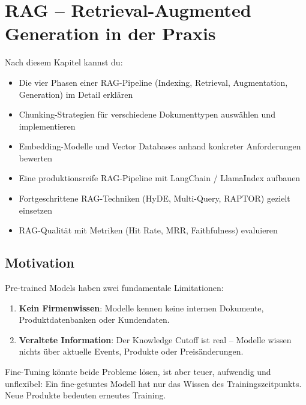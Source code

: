 \chapter{RAG -- Retrieval-Augmented Generation in der Praxis}
\label{chap:rag_vector_dbs}

\begin{lernziele}
Nach diesem Kapitel kannst du:
\begin{itemize}
    \item Die vier Phasen einer RAG-Pipeline (Indexing, Retrieval, Augmentation, Generation) im Detail erklären
    \item Chunking-Strategien für verschiedene Dokumenttypen auswählen und implementieren
    \item Embedding-Modelle und Vector Databases anhand konkreter Anforderungen bewerten
    \item Eine produktionsreife RAG-Pipeline mit LangChain / LlamaIndex aufbauen
    \item Fortgeschrittene RAG-Techniken (HyDE, Multi-Query, RAPTOR) gezielt einsetzen
    \item RAG-Qualität mit Metriken (Hit Rate, MRR, Faithfulness) evaluieren
\end{itemize}
\end{lernziele}

\section{Motivation}

Pre-trained Models haben zwei fundamentale Limitationen:

\begin{enumerate}[leftmargin=*]
    \item \textbf{Kein Firmenwissen}: Modelle kennen keine internen Dokumente, Produktdatenbanken oder Kundendaten.
    \item \textbf{Veraltete Information}: Der Knowledge Cutoff ist real -- Modelle wissen nichts über aktuelle Events, Produkte oder Preisänderungen.
\end{enumerate}

Fine-Tuning könnte beide Probleme lösen, ist aber teuer, aufwendig und unflexibel: Ein fine-getuntes Modell hat nur das Wissen des Trainingszeitpunkts. Neue Produkte bedeuten erneutes Training.

